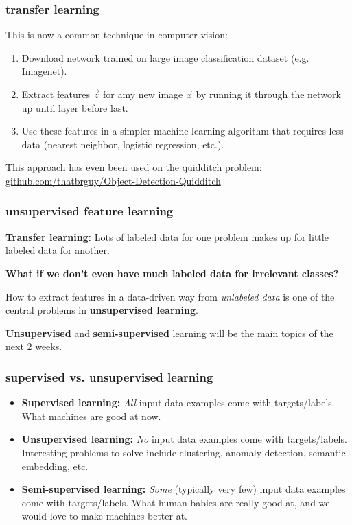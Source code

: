 \documentclass[handout,compress]{beamer}
\begin{document}
\begin{frame}
	\frametitle{transfer learning}
	\small
	This is now a common technique in computer vision:
	\begin{enumerate}
		\item Download network trained on large image classification dataset (e.g. Imagenet).
		\item Extract features $\vec{z}$ for amy new image $\vec{x}$ by running it through the network up until layer before last.
		\item Use these features in a simpler machine learning algorithm that requires less data (nearest neighbor, logistic regression, etc.).
	\end{enumerate}
This approach has even been used on the quidditch problem: \url{github.com/thatbrguy/Object-Detection-Quidditch}
\end{frame}

\begin{frame}
	\frametitle{unsupervised feature learning}
	\textbf{Transfer learning:} Lots of labeled data for one problem makes up for little labeled data for another.
	\begin{center}
		\textbf{What if we don't even have much labeled data for irrelevant classes?}
	\end{center} 
How to extract features in a data-driven way from \emph{unlabeled data} is one of the central problems in \textbf{unsupervised learning}.

\textbf{\alert{Unsupervised}} and \textbf{\alert{semi-supervised}} learning will be the main topics of the next 2 weeks.
\end{frame}

\begin{frame}
	\frametitle{supervised vs. unsupervised learning}
	\begin{itemize}
		\item \textbf{Supervised learning:} \emph{All} input data examples come with targets/labels. What machines are good at now.
		\item \textbf{Unsupervised learning:} \emph{No} input data examples come with targets/labels. Interesting problems to solve include clustering, anomaly detection, semantic embedding, etc.
		\item \textbf{Semi-supervised learning:} \emph{Some} (typically very few) input data examples come with targets/labels. What human babies are really good at, and we would love to make machines better at.
	\end{itemize}
\end{frame}
\end{document}
